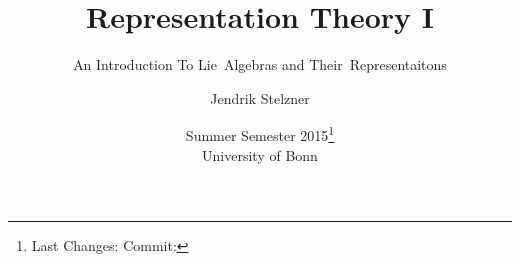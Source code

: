 \documentclass[a4paper, 10pt, oneside, openany,  bibliography=totocnumbered]{scrbook}
\title{Representation Theory I}
\subtitle{An Introduction To Lie~Algebras and Their~Representaitons}
\date{
  Summer Semester 2015\footnote{
    Last Changes: \texttt{\gitAuthorIsoDate}
    \hfill
    Commit: \texttt{\gitAbbrevHash}
  }
  \\
  University of Bonn
}
\author{Jendrik Stelzner}
\begin{document}
\frontmatter
\maketitle

\tableofcontents

\mainmatter





\appendix
\addappheadtotoc
\appendixpage


\backmatter
\printbibliography

\end{document}
